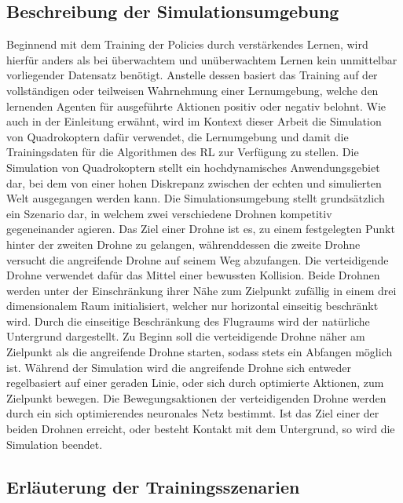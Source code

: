 \subsection{Beschreibung der Simulationsumgebung}

Beginnend mit dem Training der Policies durch verstärkendes Lernen, wird hierfür anders als bei überwachtem und unüberwachtem Lernen kein unmittelbar vorliegender Datensatz benötigt.
Anstelle dessen basiert das Training auf der vollständigen oder teilweisen Wahrnehmung einer Lernumgebung, welche den lernenden Agenten für ausgeführte Aktionen positiv oder negativ belohnt.
Wie auch in der Einleitung erwähnt, wird im Kontext dieser Arbeit die Simulation von Quadrokoptern dafür verwendet, die Lernumgebung und damit die Trainingsdaten für die Algorithmen des RL zur Verfügung zu stellen.
Die Simulation von Quadrokoptern stellt ein hochdynamisches Anwendungsgebiet dar, bei dem von einer hohen Diskrepanz zwischen der echten und simulierten Welt ausgegangen werden kann. 
Die Simulationsumgebung stellt grundsätzlich ein Szenario dar, in welchem zwei verschiedene Drohnen kompetitiv gegeneinander agieren.
Das Ziel einer Drohne ist es, zu einem festgelegten Punkt hinter der zweiten Drohne zu gelangen, währenddessen die zweite Drohne versucht die angreifende Drohne auf seinem Weg abzufangen. 
Die verteidigende Drohne verwendet dafür das Mittel einer bewussten Kollision.
Beide Drohnen werden unter der Einschränkung ihrer Nähe zum Zielpunkt zufällig in einem drei dimensionalem Raum initialisiert, welcher nur horizontal einseitig beschränkt wird.
Durch die einseitige Beschränkung des Flugraums wird der natürliche Untergrund dargestellt.
Zu Beginn soll die verteidigende Drohne näher am Zielpunkt als die angreifende Drohne starten, sodass stets ein Abfangen möglich ist.
Während der Simulation wird die angreifende Drohne sich entweder regelbasiert auf einer geraden Linie, oder sich durch optimierte Aktionen, zum Zielpunkt bewegen.
Die Bewegungsaktionen der verteidigenden Drohne werden durch ein sich optimierendes neuronales Netz bestimmt.
Ist das Ziel einer der beiden Drohnen erreicht, oder besteht Kontakt mit dem Untergrund, so wird die Simulation beendet.

\subsection{Erläuterung der Trainingsszenarien}

